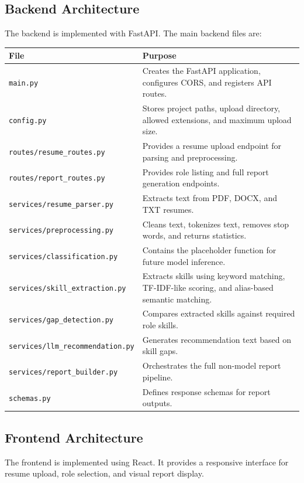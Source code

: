 \documentclass[12pt,a4paper]{article}
\begin{document}
\subsection{Backend Architecture}

The backend is implemented with FastAPI. The main backend files are:

\begin{longtable}{p{} p{}}
\toprule
\textbf{File} & \textbf{Purpose} \\
\midrule
\texttt{main.py} & Creates the FastAPI application, configures CORS, and registers API routes. \\
\texttt{config.py} & Stores project paths, upload directory, allowed extensions, and maximum upload size. \\
\texttt{routes/resume\_routes.py} & Provides a resume upload endpoint for parsing and preprocessing. \\
\texttt{routes/report\_routes.py} & Provides role listing and full report generation endpoints. \\
\texttt{services/resume\_parser.py} & Extracts text from PDF, DOCX, and TXT resumes. \\
\texttt{services/preprocessing.py} & Cleans text, tokenizes text, removes stop words, and returns statistics. \\
\texttt{services/classification.py} & Contains the placeholder function for future model inference. \\
\texttt{services/skill\_extraction.py} & Extracts skills using keyword matching, TF-IDF-like scoring, and alias-based semantic matching. \\
\texttt{services/gap\_detection.py} & Compares extracted skills against required role skills. \\
\texttt{services/llm\_recommendation.py} & Generates recommendation text based on skill gaps. \\
\texttt{services/report\_builder.py} & Orchestrates the full non-model report pipeline. \\
\texttt{schemas.py} & Defines response schemas for report outputs. \\
\bottomrule
\end{longtable}

\subsection{Frontend Architecture}

The frontend is implemented using React. It provides a responsive interface for resume upload, role selection, and visual report display.
\end{document}
